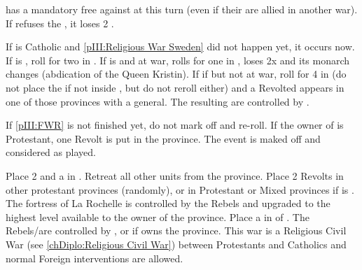 









\phevnt
\aparag \SUE has a mandatory free \CB against \paysDanemark at this turn (even
if their are allied in another war).
\aparag If \SUE refuses the \CB, it loses 2 \STAB.





\phevnt
\aparag If \SUE is Catholic and \ref{pIII:Religious War Sweden} did not happen
yet, it occurs now.
\aparag If \SUE is \PROTRIG, roll for two \REVOLT in \SUE.
\aparag If \SUE is \PROTTOL and at war, rolls for one \REVOLT in \SUE, \SUE
loses 2x \STAB and its monarch changes (abdication of the Queen Kristin).
\aparag If \SUE if \PROTTOL but not at war, roll for 4 \REVOLT in \SUE (do not
place the \REVOLT if not inside \SUE, but do not reroll either) and a Revolted
\ARMY appears in one of those provinces with a general.
\aparag The resulting \REVOLT are controlled by \SPA.





\condition{}
\aparag If \ref{pIII:FWR} is not finished yet, do not mark off and re-roll.
\aparag If the owner of \provincePoitou is Protestant, one Revolt \faceplus is
put in the province.  The event is maked off and considered as played.

\phevnt
\aparag Place 2 \REVOLT \faceplus and a \LD in \provincePoitou.  Retreat all
other units from the province.
\aparag Place 2 Revolts \facemoins in other protestant provinces (randomly),
or in Protestant or Mixed provinces if \FRA is \CATHCR.
\aparag The fortress of La Rochelle is controlled by the Rebels and upgraded
to the highest level available to the owner of the province.
\aparag Place a \PIRATE\faceplus in \CTZ of \FRA.
\aparag The Rebels/\REVOLT are controlled by \ENG, or \FRA if \ENG owns the
province. This war is a Religious Civil War (see \ref{chDiplo:Religious Civil
  War}) between Protestants and Catholics and normal Foreign interventions are
allowed.

